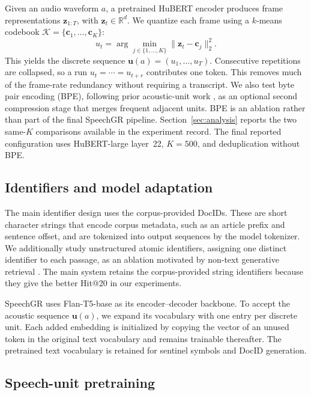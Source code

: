 Given an audio waveform \(a\), a pretrained HuBERT encoder
\citep{Hsu2021HuBERTSS} produces frame representations
\(\mathbf{z}_{1:T}\), with \(\mathbf{z}_t\in\mathbb{R}^{d}\).  We quantize
each frame using a \(k\)-means codebook
\(\mathcal{K}=\{\mathbf{c}_1,\ldots,\mathbf{c}_K\}\):
\begin{equation}
    u_t=\arg\min_{j\in\{1,\ldots,K\}}
    \lVert\mathbf{z}_t-\mathbf{c}_j\rVert_2^2 .
    \label{eq:quantization}
\end{equation}
This yields the discrete sequence
\(\mathbf{u}(a)=(u_1,\ldots,u_T)\).  Consecutive repetitions are collapsed,
so a run \(u_t=\cdots=u_{t+r}\) contributes one token.  This removes much of
the frame-rate redundancy without requiring a transcript.  We also test byte
pair encoding (BPE), following prior acoustic-unit work
\citep{Wang2024ACS}, as an optional second compression stage that merges
frequent adjacent units.  BPE is an ablation rather than part of the final
SpeechGR pipeline. Section~\ref{sec:analysis} reports the two same-\(K\)
comparisons available in the experiment record. The final reported
configuration uses HuBERT-large layer~22, \(K=500\), and deduplication without
BPE.

\subsection{Identifiers and model adaptation}
\label{sec:identifier-model}

The main identifier design uses the corpus-provided DocIDs.  These are short
character strings that encode corpus metadata, such as an article prefix and
sentence offset, and are tokenized into output sequences by the model
tokenizer.  We additionally study unstructured atomic identifiers, assigning
one distinct identifier to each passage, as an ablation motivated by
non-text generative retrieval \citep{li-etal-2024-generative}.  The main
system retains the corpus-provided string identifiers because they give the
better Hit@20 in our experiments.

SpeechGR uses Flan-T5-base \citep{10.5555/3722577.3722647} as its
encoder--decoder backbone.  To accept the acoustic sequence
\(\mathbf{u}(a)\), we expand its vocabulary with one entry per discrete unit.
Each added embedding is initialized by copying the vector of an unused token
in the original text vocabulary and remains trainable thereafter.  The
pretrained text vocabulary is retained for sentinel symbols and DocID
generation.

\subsection{Speech-unit pretraining}
\label{sec:speech-pretraining}

